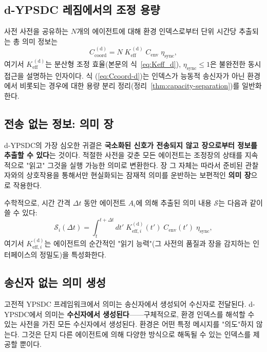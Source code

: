\documentclass[12pt,a4paper]{article}
\begin{document}
	\subsection{d-YPSDC 레짐에서의 조정 용량}
	\label{subsec:coord-capacity-dypsdc}
	
	사전 사전을 공유하는 $N$개의 에이전트에 대해 환경 인덱스로부터 단위 시간당 추출되는 총 의미 정보는
	\begin{equation}
		C_{\mathrm{coord}}^{\,(\mathrm{d})} = N \; K_{\mathrm{eff}}^{\,(\mathrm{d})} \;
		C_{\mathrm{env}} \; \eta_{\mathrm{sync}},
		\label{eq:Ccoord-d}
	\end{equation}
	여기서 $K_{\mathrm{eff}}^{\,(\mathrm{d})}$는 분산형 조정 효율(본문의 식~\eqref{eq:Keff_d}), $\eta_{\mathrm{sync}} \le 1$은 불완전한 동시 접근을 설명하는 인자이다. 식 (\ref{eq:Ccoord-d})는 인덱스가 능동적 송신자가 아닌 환경에서 비롯되는 경우에 대한 용량 분리 정리(정리~\ref{thm:capacity-separation})를 일반화한다.
	
	\subsection{전송 없는 정보: 의미 장}
	\label{subsec:semantic-field}
	
	d-YPSDC의 가장 심오한 귀결은 \textbf{국소화된 신호가 전송되지 않고 장으로부터 정보를 추출할 수 있다}는 것이다. 적절한 사전을 갖춘 모든 에이전트는 조정장의 상태를 지속적으로 "읽고" 그것을 실행 가능한 의미로 변환한다. 장 그 자체는 따라서 준비된 관찰자와의 상호작용을 통해서만 현실화되는 잠재적 의미를 운반하는 보편적인 \textbf{의미 장}으로 작용한다.
	
	수학적으로, 시간 간격 $\Delta t$ 동안 에이전트 $A_i$에 의해 추출된 의미 내용 $\mathcal{S}$는 다음과 같이 쓸 수 있다:
	\begin{equation}
		\mathcal{S}_i(\Delta t) = \int_{t}^{t+\Delta t} dt' \;
		K_{\mathrm{eff},i}^{\mathrm{(d)}}(t') \; C_{\mathrm{env}}(t') \; \eta_{\mathrm{sync}},
		\label{eq:semantic-content}
	\end{equation}
	여기서 $K_{\mathrm{eff},i}^{\mathrm{(d)}}$는 에이전트의 순간적인 "읽기 능력"(그 사전의 품질과 장을 감지하는 인터페이스의 정밀도)을 특성화한다.
	
	\subsection{송신자 없는 의미 생성}
	\label{subsec:meaning-generation}
	
	고전적 YPSDC 프레임워크에서 의미는 송신자에서 생성되어 수신자로 전달된다. d-YPSDC에서 의미는 \textbf{수신자에서 생성된다}——구체적으로, 환경 인덱스를 해석할 수 있는 사전을 가진 모든 수신자에서 생성된다. 환경은 어떤 특정 메시지를 "의도"하지 않는다. 그것은 단지 다른 에이전트에 의해 다양한 방식으로 해독될 수 있는 인덱스를 제공할 뿐이다.
	
\end{document}
